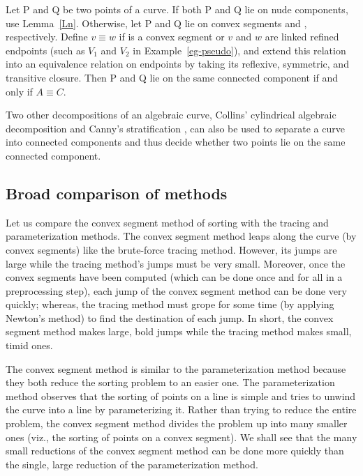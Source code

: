 \begin{lemma}
Let P and Q be two points of a curve.
If both P and Q lie on nude components, use Lemma~\ref{Ln}.
Otherwise, let P and Q lie on convex segments  and , respectively.
Define $v \equiv w$ if  is a convex segment 
or $v$ and $w$ are linked refined endpoints (such as $V_{1}$ and $V_{2}$ in 
Example~\ref{eg-pseudo}), and extend this relation into an equivalence relation 
on endpoints by taking its reflexive, symmetric, and transitive closure.
Then P and Q lie on the same connected component if and only if $A \equiv C$.
\end{lemma}

\noindent Two other decompositions of an algebraic curve, Collins' cylindrical algebraic 
decomposition \cite{Co75,arnon83} and Canny's stratification \cite{Ca}, 
can also be used to separate a curve into connected components and thus decide whether
two points lie on the same connected component.

\subsection{Broad comparison of methods}

Let us compare the convex segment method of sorting with the tracing and 
parameterization methods.
The convex segment method leaps along the curve (by convex segments)
like the brute-force tracing method.
However, its jumps are large while the tracing method's jumps must be very small.
Moreover, once the convex segments have
been computed (which can be done once and for all in a preprocessing step),
each jump of the convex segment method can be done very quickly; whereas, the tracing
method must grope for some time (by applying Newton's method) to find the destination 
of each jump.
In short, the convex segment method 
makes large, bold jumps while the tracing method makes small, timid ones.

The convex segment method is similar to the parameterization method because
they both reduce the sorting problem to an easier one.
The parameterization method observes that the sorting of points 
on a line is simple and tries to unwind the curve into a line by parameterizing it.
Rather than trying to reduce the entire problem, the convex segment method divides 
the problem up into many smaller ones (viz., the sorting of points on a convex 
segment).
We shall see that the many small reductions of the convex segment method
can be done more quickly than the single, large reduction of
the parameterization method.

